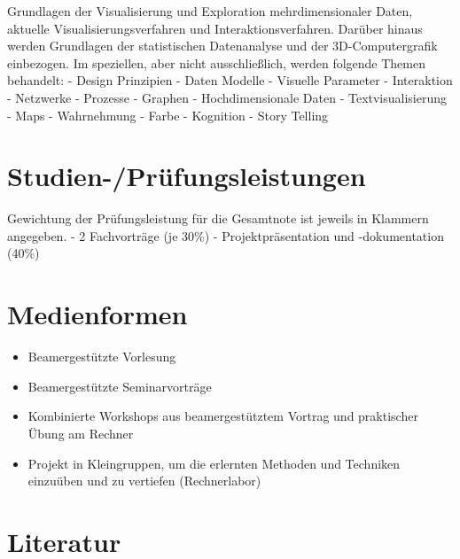 Grundlagen der Visualisierung und Exploration mehrdimensionaler Daten,
aktuelle Visualisierungsverfahren und Interaktionsverfahren. Darüber
hinaus werden Grundlagen der statistischen Datenanalyse und der
3D-Computergrafik einbezogen. Im speziellen, aber nicht ausschließlich,
werden folgende Themen behandelt: - Design Prinzipien - Daten Modelle -
Visuelle Parameter - Interaktion - Netzwerke - Prozesse - Graphen -
Hochdimensionale Daten - Textvisualisierung - Maps - Wahrnehmung - Farbe
- Kognition - Story Telling

\section*{Studien-/Prüfungsleistungen\label{/mi-2017/modulbeschreibungen-master/MA_VC_Modul_Visualisierung}}\label{studien-pruxfcfungsleistungenpathlabelmi-2017modulbeschreibungen-mastermaux5fvcux5fmodulux5fvisualisierung}

Gewichtung der Prüfungsleistung für die Gesamtnote ist jeweils in
Klammern angegeben. - 2 Fachvorträge (je 30\%) - Projektpräsentation und
-dokumentation (40\%)

\section*{Medienformen\label{/mi-2017/modulbeschreibungen-master/MA_VC_Modul_Visualisierung}}\label{medienformenpathlabelmi-2017modulbeschreibungen-mastermaux5fvcux5fmodulux5fvisualisierung}

\begin{itemize}
\tightlist
\item
  Beamergestützte Vorlesung
\item
  Beamergestützte Seminarvorträge
\item
  Kombinierte Workshops aus beamergestütztem Vortrag und praktischer
  Übung am Rechner
\item
  Projekt in Kleingruppen, um die erlernten Methoden und Techniken
  einzuüben und zu vertiefen (Rechnerlabor)
\end{itemize}

\section*{Literatur\label{/mi-2017/modulbeschreibungen-master/MA_VC_Modul_Visualisierung}}\label{literaturpathlabelmi-2017modulbeschreibungen-mastermaux5fvcux5fmodulux5fvisualisierung}

